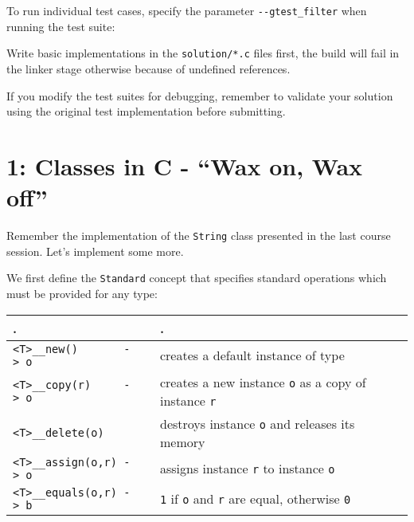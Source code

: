 \documentclass[]{article}
\newenvironment{Shaded}{}{}
\newcommand{\KeywordTok}[1]{\textcolor[rgb]{0.00,0.44,0.13}{\textbf{{#1}}}}
\newcommand{\StringTok}[1]{\textcolor[rgb]{0.25,0.44,0.63}{{#1}}}
\newcommand{\CommentTok}[1]{\textcolor[rgb]{0.38,0.63,0.69}{\textit{{#1}}}}
\newcommand{\NormalTok}[1]{{#1}}
\begin{document}
\begin{Shaded}
\end{Shaded}

To run individual test cases, specify the parameter
\texttt{-\/-gtest\_filter} when running the test suite:

\begin{Shaded}
\end{Shaded}

Write basic implementations in the \texttt{solution/*.c} files first,
the build will fail in the linker stage otherwise because of undefined
references.

If you modify the test suites for debugging, remember to validate your
solution using the original test implementation before submitting.

\section{\texorpdfstring{1: Classes in C - ``Wax on, Wax
off''}{1: Classes in C - Wax on, Wax off}}\label{classes-in-c---wax-on-wax-off}

Remember the implementation of the \texttt{String} class presented in
the last course session. Let's implement some more.

We first define the \texttt{Standard} concept that specifies standard
operations which must be provided for any type:

\begin{longtable}[c]{@{}ll@{}}
\toprule
. & .\tabularnewline
\midrule
\endhead
\texttt{\textless{}T\textgreater{}\_\_new()\ \ \ \ \ \ \ -\textgreater{}\ o}
& creates a default instance of type \tabularnewline
\texttt{\textless{}T\textgreater{}\_\_copy(r)\ \ \ \ \ -\textgreater{}\ o}
& creates a new instance \texttt{o} as a copy of instance
\texttt{r}\tabularnewline
\texttt{\textless{}T\textgreater{}\_\_delete(o)} & destroys instance
\texttt{o} and releases its memory\tabularnewline
\texttt{\textless{}T\textgreater{}\_\_assign(o,r)\ -\textgreater{}\ o\textquotesingle{}}
& assigns instance \texttt{r} to instance \texttt{o}\tabularnewline
\texttt{\textless{}T\textgreater{}\_\_equals(o,r)\ -\textgreater{}\ b} &
\texttt{1} if \texttt{o} and \texttt{r} are equal, otherwise
\texttt{0}\tabularnewline
\bottomrule
\end{longtable}
\end{document}
